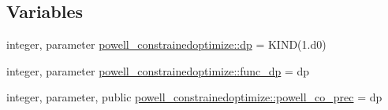 \subsection*{Variables}
\begin{DoxyCompactItemize}
\item 
integer, parameter \mbox{\hyperlink{namespacepowell__constrainedoptimize_a8a0275c8eca26a533d0e5d9aef7b9eaa}{powell\+\_\+constrainedoptimize\+::dp}} = K\+I\+ND(1.d0)
\item 
integer, parameter \mbox{\hyperlink{namespacepowell__constrainedoptimize_a09e82bbc40fa02c9929d47a2d1c56bdb}{powell\+\_\+constrainedoptimize\+::func\+\_\+dp}} = dp
\item 
integer, parameter, public \mbox{\hyperlink{namespacepowell__constrainedoptimize_a18207be3e2f370a42332601cfccca22e}{powell\+\_\+constrainedoptimize\+::powell\+\_\+co\+\_\+prec}} = dp
\end{DoxyCompactItemize}
